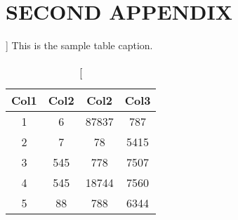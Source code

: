 
\chapter{{SECOND APPENDIX}}


\begin{table}[ht]
\renewcommand{\arraystretch}{1.5}
\centering
\caption%
 []
 {This is the sample table caption.\label{table2}}
 \begin{tabular}{||c c c c||}
 
 \hline
 Col1 & Col2 & Col2 & Col3 \\ [0.5ex] 
 \hline\hline
 1 & 6 & 87837 & 787 \\ 
 2 & 7 & 78 & 5415 \\
 3 & 545 & 778 & 7507 \\
 4 & 545 & 18744 & 7560 \\
 5 & 88 & 788 & 6344 \\ [1ex] 
 \hline
 \end{tabular}
\end{table}


